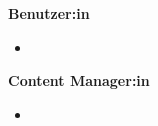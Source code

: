 




\textbf{Benutzer:in}
\begin{itemize}
    \item 
\end{itemize}
\textbf{Content Manager:in}
\begin{itemize}
    \item 
\end{itemize}
